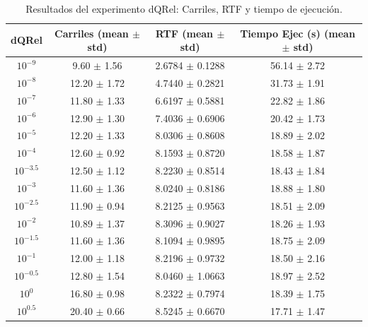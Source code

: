\begin{table}[htbp]
\centering
\caption{Resultados del experimento dQRel: Carriles, RTF y tiempo de ejecución.}
\label{tab:deltaq}
\begin{tabular}{cccc}
\hline
dQRel & Carriles (mean $\pm$ std) & RTF (mean $\pm$ std) & Tiempo Ejec (s) (mean $\pm$ std) \\
\hline
$10^{-9}$ & 9.60 $\pm$ 1.56 & 2.6784 $\pm$ 0.1288 & 56.14 $\pm$ 2.72 \\
$10^{-8}$ & 12.20 $\pm$ 1.72 & 4.7440 $\pm$ 0.2821 & 31.73 $\pm$ 1.91 \\
$10^{-7}$ & 11.80 $\pm$ 1.33 & 6.6197 $\pm$ 0.5881 & 22.82 $\pm$ 1.86 \\
$10^{-6}$ & 12.90 $\pm$ 1.30 & 7.4036 $\pm$ 0.6906 & 20.42 $\pm$ 1.73 \\
$10^{-5}$ & 12.20 $\pm$ 1.33 & 8.0306 $\pm$ 0.8608 & 18.89 $\pm$ 2.02 \\
$10^{-4}$ & 12.60 $\pm$ 0.92 & 8.1593 $\pm$ 0.8720 & 18.58 $\pm$ 1.87 \\
$10^{-3.5}$ & 12.50 $\pm$ 1.12 & 8.2230 $\pm$ 0.8514 & 18.43 $\pm$ 1.84 \\
$10^{-3}$ & 11.60 $\pm$ 1.36 & 8.0240 $\pm$ 0.8186 & 18.88 $\pm$ 1.80 \\
$10^{-2.5}$ & 11.90 $\pm$ 0.94 & 8.2125 $\pm$ 0.9563 & 18.51 $\pm$ 2.09 \\
$10^{-2}$ & 10.89 $\pm$ 1.37 & 8.3096 $\pm$ 0.9027 & 18.26 $\pm$ 1.93 \\
$10^{-1.5}$ & 11.60 $\pm$ 1.36 & 8.1094 $\pm$ 0.9895 & 18.75 $\pm$ 2.09 \\
$10^{-1}$ & 12.00 $\pm$ 1.18 & 8.2196 $\pm$ 0.9732 & 18.50 $\pm$ 2.16 \\
$10^{-0.5}$ & 12.80 $\pm$ 1.54 & 8.0460 $\pm$ 1.0663 & 18.97 $\pm$ 2.52 \\
$10^{0}$ & 16.80 $\pm$ 0.98 & 8.2322 $\pm$ 0.7974 & 18.39 $\pm$ 1.75 \\
$10^{0.5}$ & 20.40 $\pm$ 0.66 & 8.5245 $\pm$ 0.6670 & 17.71 $\pm$ 1.47 \\
\hline
\end{tabular}
\end{table}
